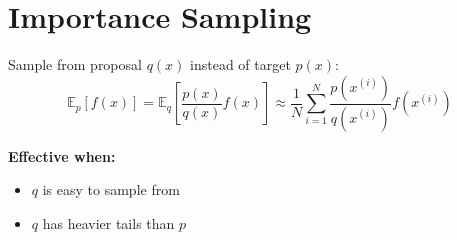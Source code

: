 
\section{Importance Sampling }
\label{sec:importance-sampling}

Sample from proposal $q(x)$ instead of target $p(x)$:
\begin{equation}
\mathbb{E}_{p}[f(x)] = \mathbb{E}_{q}\left[\frac{p(x)}{q(x)} f(x)\right] \approx \frac{1}{N} \sum_{i=1}^{N} \frac{p(x^{(i)})}{q(x^{(i)})} f(x^{(i)})
\end{equation}

\textbf{Effective when:}
\begin{itemize}
    \item $q$ is easy to sample from
    \item $q$ has heavier tails than $p$
\end{itemize}






